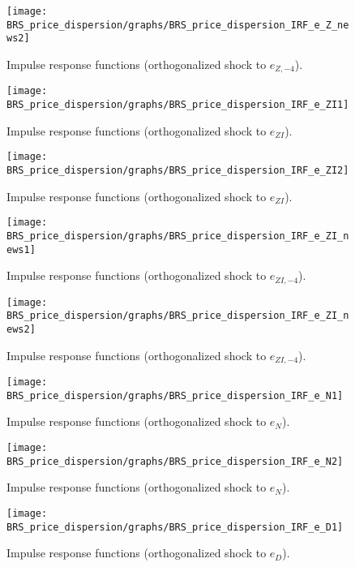 \begin{figure}[H]
\centering 
\texttt{[image: BRS\_price\_dispersion/graphs/BRS\_price\_dispersion\_IRF\_e\_Z\_news2]}
\caption{Impulse response functions (orthogonalized shock to ${e_{Z,-4}}$).}\label{Fig:IRF:e_Z_news:2}
\end{figure}
 
\begin{figure}[H]
\centering 
\texttt{[image: BRS\_price\_dispersion/graphs/BRS\_price\_dispersion\_IRF\_e\_ZI1]}
\caption{Impulse response functions (orthogonalized shock to ${e_{ZI}}$).}\label{Fig:IRF:e_ZI:1}
\end{figure}
 
\begin{figure}[H]
\centering 
\texttt{[image: BRS\_price\_dispersion/graphs/BRS\_price\_dispersion\_IRF\_e\_ZI2]}
\caption{Impulse response functions (orthogonalized shock to ${e_{ZI}}$).}\label{Fig:IRF:e_ZI:2}
\end{figure}
 
\begin{figure}[H]
\centering 
\texttt{[image: BRS\_price\_dispersion/graphs/BRS\_price\_dispersion\_IRF\_e\_ZI\_news1]}
\caption{Impulse response functions (orthogonalized shock to ${e_{ZI,-4}}$).}\label{Fig:IRF:e_ZI_news:1}
\end{figure}
 
\begin{figure}[H]
\centering 
\texttt{[image: BRS\_price\_dispersion/graphs/BRS\_price\_dispersion\_IRF\_e\_ZI\_news2]}
\caption{Impulse response functions (orthogonalized shock to ${e_{ZI,-4}}$).}\label{Fig:IRF:e_ZI_news:2}
\end{figure}
 
\begin{figure}[H]
\centering 
\texttt{[image: BRS\_price\_dispersion/graphs/BRS\_price\_dispersion\_IRF\_e\_N1]}
\caption{Impulse response functions (orthogonalized shock to ${e_N}$).}\label{Fig:IRF:e_N:1}
\end{figure}
 
\begin{figure}[H]
\centering 
\texttt{[image: BRS\_price\_dispersion/graphs/BRS\_price\_dispersion\_IRF\_e\_N2]}
\caption{Impulse response functions (orthogonalized shock to ${e_N}$).}\label{Fig:IRF:e_N:2}
\end{figure}
 
\begin{figure}[H]
\centering 
\texttt{[image: BRS\_price\_dispersion/graphs/BRS\_price\_dispersion\_IRF\_e\_D1]}
\caption{Impulse response functions (orthogonalized shock to ${e_D}$).}\label{Fig:IRF:e_D:1}
\end{figure}
 
